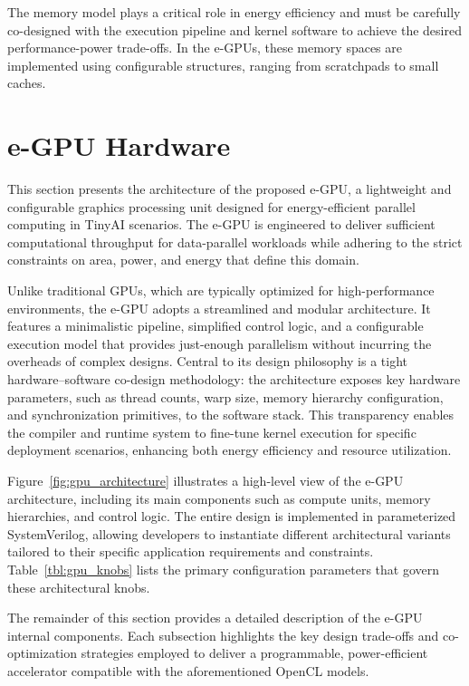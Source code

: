             The memory model plays a critical role in energy efficiency and must be carefully co-designed with the execution pipeline and kernel software to achieve the desired performance-power trade-offs. In the \mbox{e-GPUs}, these memory spaces are implemented using configurable structures, ranging from scratchpads to small caches.

    \section{e-GPU Hardware}
    \label{sec:e-gpu_hardware}
    
        This section presents the architecture of the proposed \mbox{e-GPU}, a lightweight and configurable graphics processing unit designed for energy-efficient parallel computing in TinyAI scenarios. The \mbox{e-GPU} is engineered to deliver sufficient computational throughput for data-parallel workloads while adhering to the strict constraints on area, power, and energy that define this domain.
        
        Unlike traditional GPUs, which are typically optimized for high-performance environments, the \mbox{e-GPU} adopts a streamlined and modular architecture. It features a minimalistic pipeline, simplified control logic, and a configurable execution model that provides just-enough parallelism without incurring the overheads of complex designs. Central to its design philosophy is a tight hardware–software co-design methodology: the architecture exposes key hardware parameters, such as thread counts, warp size, memory hierarchy configuration, and synchronization primitives, to the software stack. This transparency enables the compiler and runtime system to fine-tune kernel execution for specific deployment scenarios, enhancing both energy efficiency and resource utilization.
        
        Figure~\ref{fig:gpu_architecture} illustrates a high-level view of the \mbox{e-GPU} architecture, including its main components such as compute units, memory hierarchies, and control logic. The entire design is implemented in parameterized SystemVerilog, allowing developers to instantiate different architectural variants tailored to their specific application requirements and constraints. Table~\ref{tbl:gpu_knobs} lists the primary configuration parameters that govern these architectural knobs.
        
        The remainder of this section provides a detailed description of the \mbox{e-GPU} internal components. Each subsection highlights the key design trade-offs and co-optimization strategies employed to deliver a programmable, power-efficient accelerator compatible with the aforementioned OpenCL models.

